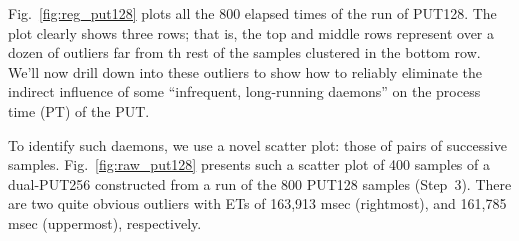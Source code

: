 \documentclass[letter]{ieice}
\begin{document}
Fig.~\ref{fig:reg_put128} plots all the 800 elapsed times of the run of PUT128.
The plot clearly shows three rows; that is, 
the top and middle rows represent over a dozen of outliers far from 
th rest of the samples clustered in the bottom row. 
We'll now drill down into these outliers to 
show how to reliably eliminate the indirect influence of 
some ``infrequent, long-running daemons'' on the process time (PT) 
of the PUT.

To identify such daemons, we use a novel scatter plot: 
those of pairs of successive samples. 
Fig.~\ref{fig:raw_put128} presents such a scatter plot 
of 400 samples of a \hbox{dual-PUT256} constructed 
from a run of the 800 PUT128 samples (Step~3). 
There are two quite obvious outliers with ETs of 163,913 msec (rightmost), and 161,785 msec (uppermost), respectively. 
\end{document}
